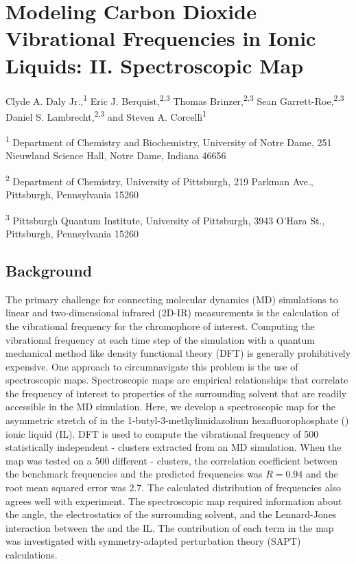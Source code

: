 \chapter[Spectroscopic Map]{Modeling Carbon Dioxide Vibrational Frequencies in Ionic Liquids: II. Spectroscopic Map}
\label{ch:paper_03}

Clyde A. Daly Jr.,\textsuperscript{1} Eric J. Berquist,\textsuperscript{2,3} Thomas Brinzer,\textsuperscript{2,3} Sean Garrett-Roe,\textsuperscript{2,3} Daniel S. Lambrecht,\textsuperscript{2,3} and Steven A. Corcelli\textsuperscript{1}

\textsuperscript{1} Department of Chemistry and Biochemistry, University of Notre Dame, 251 Nieuwland Science Hall, Notre Dame, Indiana 46656

\textsuperscript{2} Department of Chemistry, University of Pittsburgh, 219 Parkman Ave., Pittsburgh, Pennsylvania 15260

\textsuperscript{3} Pittsburgh Quantum Institute, University of Pittsburgh, 3943 O'Hara St., Pittsburgh, Pennsylvania 15260

\section{Background}

The primary challenge for connecting molecular dynamics (MD) simulations to linear and two-dimensional infrared (2D-IR) measurements is the calculation of the vibrational frequency for the chromophore of interest. Computing the vibrational frequency at each time step of the simulation with a quantum mechanical method like density functional theory (DFT) is generally prohibitively expensive. One approach to circumnavigate this problem is the use of spectroscopic maps. Spectroscopic maps are empirical relationships that correlate the frequency of interest to properties of the surrounding solvent that are readily accessible in the MD simulation. Here, we develop a spectroscopic map for the asymmetric stretch of  in the 1-butyl-3-methylimidazolium hexafluorophosphate (\ce{[C4C1im][PF6]}) ionic liquid (IL). DFT is used to compute the vibrational frequency of \num{500} statistically independent -\ce{[C4C1im][PF6]} clusters extracted from an MD simulation. When the map was tested on a \num{500} different -\ce{[C4C1im][PF6]} clusters, the correlation coefficient between the benchmark frequencies and the predicted frequencies was \(R = 0.94\) and the root mean squared error was \SI{2.7}{\wavenumber}. The calculated distribution of frequencies also agrees well with experiment. The spectroscopic map required information about the  angle, the electrostatics of the surrounding solvent, and the Lennard-Jones interaction between the  and the IL. The contribution of each term in the map was investigated with symmetry-adapted perturbation theory (SAPT) calculations.

